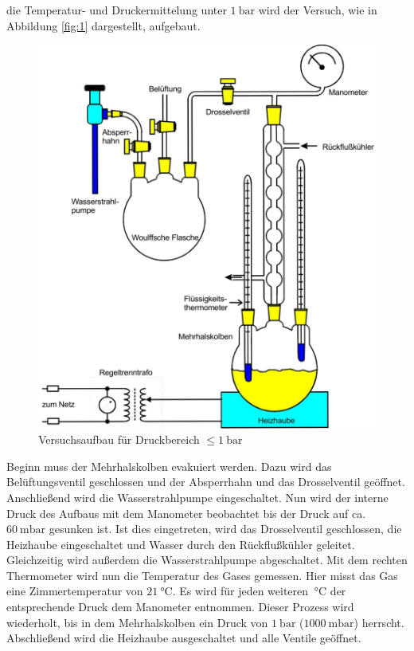 \justifying die Temperatur- und Druckermittelung unter $\SI{1}{\bar}$ wird der Versuch, wie in Abbildung \ref{fig:1} dargestellt,
aufgebaut.

\begin{figure}
    \centering
    \includegraphics[width=0.75\linewidth]{./images/k1bar.jpg}
    \caption{Versuchsaufbau für Druckbereich $\leq \SI{1}{\bar}$ \cite{V203}}
    \label{fig:2}
\end{figure}
\newpage

\justifying Beginn muss der Mehrhalskolben evakuiert werden. Dazu wird das Belüftungsventil geschlossen und der Absperrhahn und
das Drosselventil geöffnet. Anschließend wird die Wasserstrahlpumpe eingeschaltet. Nun wird der interne Druck des Aufbaus mit dem Manometer
beobachtet bis der Druck auf ca. $\SI{60}{\milli\bar}$ gesunken ist. Ist dies eingetreten, wird das Drosselventil geschlossen, die Heizhaube
eingeschaltet und Wasser durch den Rückflußkühler geleitet. Gleichzeitig wird außerdem die Wasserstrahlpumpe abgeschaltet. Mit dem rechten
Thermometer wird nun die Temperatur des Gases gemessen. Hier misst das Gas eine Zimmertemperatur von $\SI{21}{\celsius}$. Es wird für jeden 
weiteren $\SI{}{\celsius}$ der entsprechende Druck dem Manometer entnommen. Dieser Prozess wird wiederholt, bis in dem Mehrhalskolben ein Druck 
von $\SI{1}{\bar}$ ($\SI{1000}{\milli\bar}$) herrscht. Abschließend wird die Heizhaube ausgeschaltet und alle Ventile geöffnet.  


